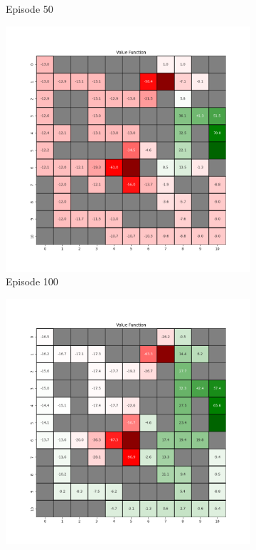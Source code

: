 \documentclass{assignment}
\begin{document}
\begin{figure}[H]
\begin{subfigure}{0.3\textwidth}
    \caption{Episode 50}
    \end{subfigure}\hfill
    \begin{subfigure}{0.3\textwidth}
        \includegraphics[width=\textwidth]{figures/value_td/alpha_sweep/value_function_alpha_0.1_gamma_0.95_epsilon_0.2_iteration_100.png}
    \caption{Episode 100}
    \end{subfigure}
    \begin{subfigure}{0.3\textwidth}
        \includegraphics[width=\textwidth]{figures/value_td/alpha_sweep/value_function_alpha_0.1_gamma_0.95_epsilon_0.2_iteration_1000.png}

\end{subfigure}
\end{figure}
\end{document}
